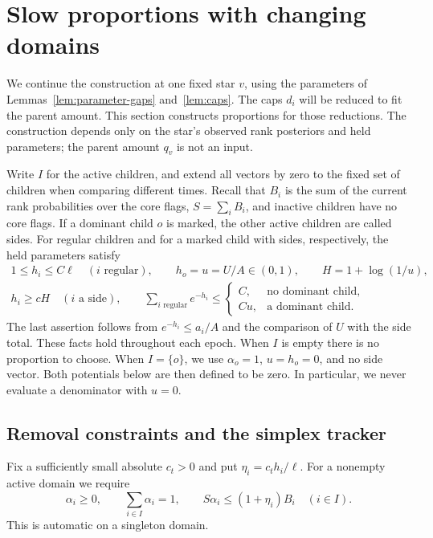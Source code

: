\section{Slow proportions with changing domains}
\label{sec:proportions}

We continue the construction at one fixed star $v$, using the parameters
of Lemmas~\ref{lem:parameter-gaps} and~\ref{lem:caps}.
The caps $d_i$ will be reduced to fit the parent amount.  This section
constructs proportions for those reductions.  The construction depends
only on the star's observed rank posteriors and held parameters; the
parent amount $q_v$ is not an input.

Write $I$ for the active children, and extend all vectors by zero to the
fixed set of children when comparing different times.  Recall that
$B_i$ is the sum of the current rank probabilities over the core flags,
$S=\sum_i B_i$, and inactive children have no core flags.
If a dominant child $o$ is marked, the other active children are called
sides.  For regular children and for a marked child with sides,
respectively, the held parameters satisfy
\begin{equation}\label{eq:proportion-parameter-facts}
\begin{gathered}
  1\le h_i\le C\ell\quad(i\text{ regular}),\qquad
  h_o=u=U/A\in(0,1),\qquad H=1+\log(1/u),\\
  h_i\ge cH\quad(i\text{ a side}),\qquad
  \sum_{i\text{ regular}}e^{-h_i}\le
  \begin{cases} C,&\text{no dominant child},\\ Cu,&\text{a dominant child}.
  \end{cases}
\end{gathered}
\end{equation}
The last assertion follows from $e^{-h_i}\le a_i/A$ and the comparison
of $U$ with the side total.  These facts hold throughout each epoch.
When $I$ is empty there is no proportion to choose.  When $I=\{o\}$,
we use $\alpha_o=1$, $u=h_o=0$, and no side vector.  Both potentials
below are then defined to be zero.  In particular, we never evaluate a
denominator with $u=0$.

\subsection{Removal constraints and the simplex tracker}

Fix a sufficiently small absolute $c_t>0$ and put
$\eta_i=c_t h_i/\ell$.  For a nonempty active domain we require
\begin{equation}\label{eq:alpha-feasibility}
  \alpha_i\ge0,\qquad \sum_{i\in I}\alpha_i=1,
  \qquad S\alpha_i\le(1+\eta_i)B_i\quad(i\in I).
\end{equation}
This is automatic on a singleton domain.

